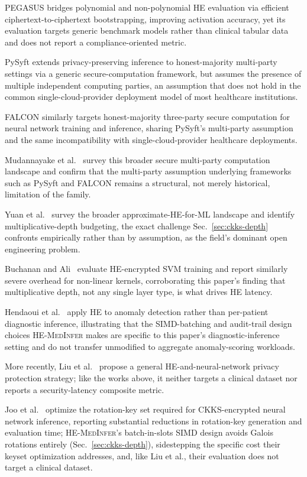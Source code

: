 \documentclass[journal,compsoc]{IEEEtran}
\newcommand{\framework}{\textsc{HE-MedInfer}}
\begin{document}
PEGASUS
\cite{lu2021pegasus} bridges polynomial and non-polynomial HE evaluation via
efficient ciphertext-to-ciphertext bootstrapping, improving activation
accuracy, yet its evaluation targets generic benchmark models rather than
clinical tabular data and does not report a compliance-oriented metric.

PySyft \cite{ryffel2018generic} extends privacy-preserving inference to
honest-majority multi-party settings via a generic secure-computation
framework, but assumes the presence of multiple independent computing
parties, an assumption that does not hold in the common single-cloud-provider
deployment model of most healthcare institutions.

FALCON \cite{wagh2020falcon} similarly targets honest-majority three-party
secure computation for neural network training and inference, sharing
PySyft's multi-party assumption and the same incompatibility with
single-cloud-provider healthcare deployments.

Mudannayake et
al.~\cite{mudannayake2025smpc} survey this broader secure multi-party
computation landscape and confirm that the multi-party assumption underlying
frameworks such as PySyft and FALCON remains a structural, not merely
historical, limitation of the family.

Yuan et
al.~\cite{yuan2025survey} survey the broader approximate-HE-for-ML landscape
and identify multiplicative-depth budgeting, the exact challenge
Sec.~\ref{sec:ckks-depth} confronts empirically rather than by assumption, as
the field's dominant open engineering problem.

Buchanan and
Ali~\cite{buchanan2025svm} evaluate HE-encrypted SVM training and report
similarly severe overhead for non-linear kernels, corroborating this paper's
finding that multiplicative depth, not any single layer type, is what drives
HE latency.

Hendaoui et al.~\cite{hendaoui2025epad} apply HE to anomaly
detection rather than per-patient diagnostic inference, illustrating that the
SIMD-batching and audit-trail design choices \framework{} makes are specific
to this paper's diagnostic-inference setting and do not transfer unmodified
to aggregate anomaly-scoring workloads.

More recently, Liu et
al.~\cite{liu2024privacy} propose a general HE-and-neural-network privacy
protection strategy; like the works above, it neither targets a clinical
dataset nor reports a security-latency composite metric.

Joo et al.~\cite{joo2025keyset} optimize the
rotation-key set required for CKKS-encrypted neural network inference,
reporting substantial reductions in rotation-key generation and evaluation
time; \framework{}'s batch-in-slots SIMD design avoids Galois
rotations entirely (Sec.~\ref{sec:ckks-depth}), sidestepping the specific
cost their keyset optimization addresses, and, like Liu et al., their
evaluation does not target a clinical dataset.
\end{document}
